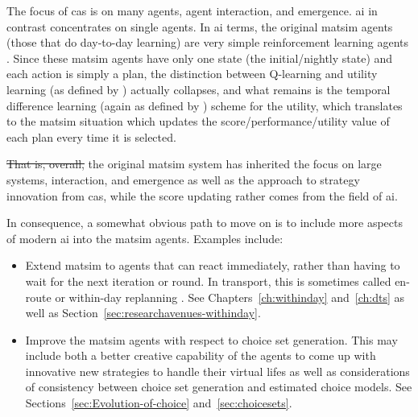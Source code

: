 The focus of \gls{cas} is on many agents, agent interaction, and emergence. \Gls{ai} in contrast concentrates on single agents. In \gls{ai} terms, the original \gls{matsim} agents (those that do day-to-day learning) are very simple 
reinforcement learning agents \citep[][Chapter 21.3]{RusselNorvig2010ArtificialIntelligence}. Since these \gls{matsim} agents have only one state (the initial/nightly state) and each action is simply a plan, the distinction between Q-learning and utility learning (as defined by \cite{RusselNorvig2010ArtificialIntelligence}) actually collapses, and what remains is the temporal difference 
learning (again as defined by \cite{RusselNorvig2010ArtificialIntelligence}) scheme for the utility, which translates to the \gls{matsim} situation which updates the score/performance/utility value of each plan every time it is selected.

\st{That is, overall,}  the original \gls{matsim} system has inherited the focus on large systems, interaction, and emergence as well as the approach to strategy innovation from \gls{cas}, while the score updating rather comes from the field of \gls{ai}.

In consequence, a somewhat obvious path to move on is to include more aspects of modern \gls{ai} into the \gls{matsim} agents.  Examples include:
\begin{itemize}

\item Extend \gls{matsim} to agents that can react 
immediately, rather than having to wait for the next iteration or round.  In transport, this is sometimes called en-route or within-day replanning \citep[e.g.,][]{EmmerinkEtAl_TransResC_1995,balijepalli-2007}.  See Chapters~\ref{ch:withinday} and~\ref{ch:dts} as well as Section~\ref{sec:researchavenues-withinday}.

\item Improve the \gls{matsim} agents with respect to choice set generation.  This may include both a better creative capability of the agents to come up with innovative new strategies to handle their virtual lifes as well as considerations of consistency between choice set generation and estimated choice models.  See Sections~\ref{sec:Evolution-of-choice} and~\ref{sec:choicesets}.

\end{itemize}


